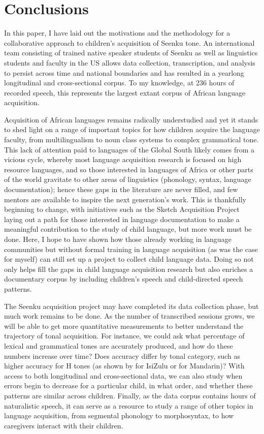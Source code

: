 \documentclass[output=paper,colorlinks,citecolor=brown,
]{langscibook}
\begin{document}
\section{Conclusions}\label{sec:mcpherson:conclusion}

In this paper, I have laid out the motivations and the methodology for a collaborative approach to children's acquisition of Seenku tone. An international team consisting of trained native speaker students of Seenku as well as linguistics students and faculty in the US allows data collection, transcription, and analysis to persist across time and national boundaries and has resulted in a yearlong longitudinal and cross-sectional corpus. To my knowledge, at 236 hours of recorded speech, this represents the largest extant corpus of African language acquisition. 

Acquisition of African languages remains radically understudied and yet it stands to shed light on a range of important topics for how children acquire the language faculty, from multilingualism to noun class systems to complex grammatical tone. This lack of attention paid to languages of the Global South likely comes from a vicious cycle, whereby most language acquisition research is focused on high resource languages, and so those interested in languages of Africa or other parts of the world gravitate to other areas of linguistics (phonology, syntax, language documentation); hence these gaps in the literature are never filled, and few mentors are available to inspire the next generation's work. This is thankfully beginning to change, with initiatives such as the Sketch Acquisition Project laying out a path for those interested in language documentation to make a meaningful contribution to the study of child language, but more work must be done. Here, I hope to have shown how those already working in language communities but without formal training in language acquisition (as was the case for myself) can still set up a project to collect child language data. Doing so not only helps fill the gaps in child language acquisition research but also enriches a documentary corpus by including children's speech and child-directed speech patterns.

The Seenku acquisition project may have completed its data collection phase, but much work remains to be done. As the number of transcribed sessions grows, we will be able to get more quantitative measurements to better understand the trajectory of tonal acquisition. For instance, we could ask what percentage of lexical and grammatical tones are accurately produced, and how do these numbers increase over time? Does accuracy differ by tonal category, such as higher accuracy for H tones (as shown by \citealt{Suzman91} for IsiZulu or \citealt{LiThompson77} for Mandarin)? With access to both longitudinal and cross-sectional data, we can also study when errors begin to decrease for a particular child, in what order, and whether these patterns are similar across children. Finally, as the data corpus contains hours of naturalistic speech, it can serve as a resource to study a range of other topics in language acquisition, from segmental phonology to morphosyntax, to how caregivers interact with their children. 
\end{document}
